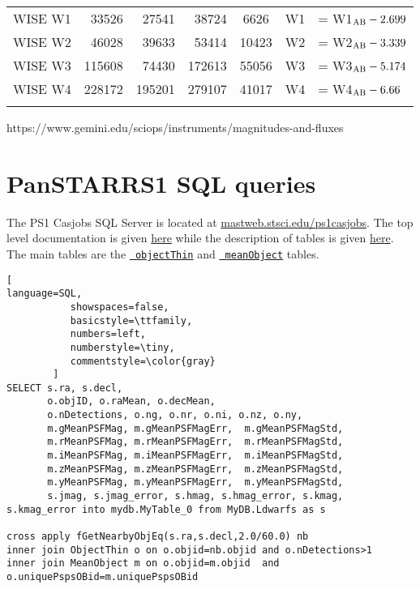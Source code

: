\documentclass[usenatbib]{mnras}
\begin{document}
\begin{table*}
\begin{center}
\begin{tabular}{l r r r  c l l}
      WISE W1               &    33526    &    27541  &    38724   &    6626    & W1                        &   = W1$_{\rm AB} - 2.699$ \\
      WISE W2               &    46028    &    39633  &    53414   &  10423    & W2                        &   = W2$_{\rm AB} - 3.339$ \\
      WISE W3               &  115608    &    74430  &  172613   &  55056    & W3                        &   = W3$_{\rm AB} - 5.174$ \\
      WISE W4               &  228172    &  195201  &  279107   &  41017    & W4                        &   = W4$_{\rm AB} - 6.66$ \\
      \hline
      \hline
      \label{tab:filter_details}
    \end{tabular}
     \end{center}
\end{table*}
https://www.gemini.edu/sciops/instruments/magnitudes-and-fluxes

\section{PanSTARRS1 SQL queries}\label{sec:PS1_SQL}
The PS1 Casjobs SQL Server is located at
\href{http://mastweb.stsci.edu/ps1casjobs}{mastweb.stsci.edu/ps1casjobs}.
The top level documentation is given
\href{https://outerspace.stsci.edu/display/PANSTARRS/PS1+Source+extraction+and+catalogs}{here}
while the description of tables is given
\href{https://outerspace.stsci.edu/display/PANSTARRS/PS1+Source+extraction+and+catalogs#PS1Sourceextractionandcatalogs}{here}. The
main tables are the
\href{https://outerspace.stsci.edu/display/PANSTARRS/PS1+ObjectThin+table+fields}{{\tt
objectThin}} and
\href{https://outerspace.stsci.edu/display/PANSTARRS/PS1+MeanObject+table+fields}{{\tt
meanObject}} tables.

\onecolumn
\begin{lstlisting}[
language=SQL,
           showspaces=false,
           basicstyle=\ttfamily,
           numbers=left,
           numberstyle=\tiny,
           commentstyle=\color{gray}
        ]
SELECT s.ra, s.decl, 
       o.objID, o.raMean, o.decMean, 
       o.nDetections, o.ng, o.nr, o.ni, o.nz, o.ny, 
       m.gMeanPSFMag, m.gMeanPSFMagErr,  m.gMeanPSFMagStd, 
       m.rMeanPSFMag, m.rMeanPSFMagErr,  m.rMeanPSFMagStd, 
       m.iMeanPSFMag, m.iMeanPSFMagErr,  m.iMeanPSFMagStd, 
       m.zMeanPSFMag, m.zMeanPSFMagErr,  m.zMeanPSFMagStd, 
       m.yMeanPSFMag, m.yMeanPSFMagErr,  m.yMeanPSFMagStd, 
       s.jmag, s.jmag_error, s.hmag, s.hmag_error, s.kmag, s.kmag_error into mydb.MyTable_0 from MyDB.Ldwarfs as s

cross apply fGetNearbyObjEq(s.ra,s.decl,2.0/60.0) nb
inner join ObjectThin o on o.objid=nb.objid and o.nDetections>1 
inner join MeanObject m on o.objid=m.objid  and o.uniquePspsOBid=m.uniquePspsOBid
\end{lstlisting}
\twocolumn
\end{document}
